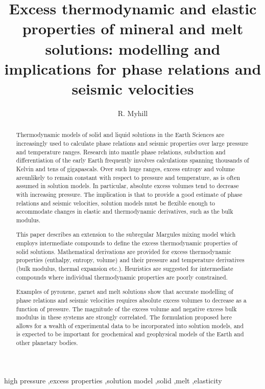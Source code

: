 \documentclass[review]{elsarticle}
\begin{document}
\begin{frontmatter}

\title{Excess thermodynamic and elastic properties of mineral and melt solutions: modelling and implications for phase relations and seismic velocities}

\author{R. Myhill}
\address{Bayerisches Geoinstitut, Universit\"{a}t Bayreuth, Universit\"{a}tsstrasse 30, 95447 Bayreuth, Germany}

\begin{abstract}
Thermodynamic models of solid and liquid solutions in the Earth Sciences are increasingly used to calculate phase relations and seismic properties over large pressure and temperature ranges. Research into mantle phase relations, subduction and differentiation of the early Earth frequently involves calculations spanning thousands of Kelvin and tens of gigapascals. Over such huge ranges, excess entropy and volume areunlikely to remain constant with respect to pressure and temperature, as is often assumed in solution models. In particular, absolute excess volumes tend to decrease with increasing pressure. The implication is that to provide a good estimate of phase relations and seismic velocities, solution models must be flexible enough to accommodate changes in elastic and thermodynamic derivatives, such as the bulk modulus.

This paper describes an extension to the subregular Margules mixing model which employs intermediate compounds to define the excess thermodynamic properties of solid solutions. Mathematical derivations are provided for excess thermodynamic properties (enthalpy, entropy, volume) and their pressure and temperature derivatives (bulk modulus, thermal expansion etc.). Heuristics are suggested for intermediate compounds where individual thermodynamic properties are poorly constrained.

Examples of pyroxene, garnet and melt solutions show that accurate modelling of phase relations and seismic velocities requires absolute excess volumes to decrease as a function of pressure. The magnitude of the excess volume and negative excess bulk modulus in these systems are strongly correlated. The formulation proposed here allows for a wealth of experimental data to be incorporated into solution models, and is expected to be important for geochemical and geophysical models of the Earth and other planetary bodies.
\end{abstract}

\begin{keyword}
high pressure \sep excess properties \sep solution model \sep solid \sep melt \sep elasticity
\end{keyword}

\end{frontmatter}
\end{document}
